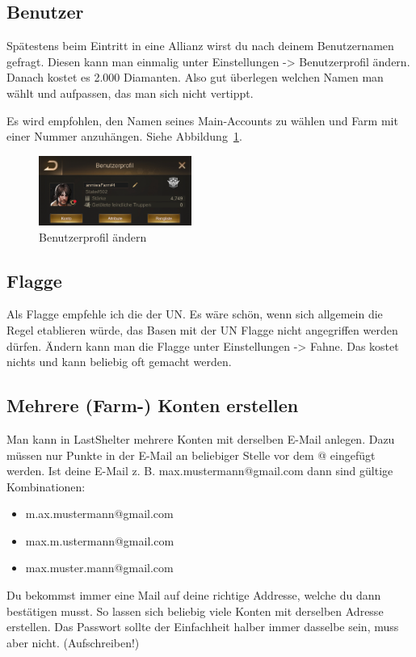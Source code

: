\documentclass[fontsize=12pt,a4paper]{scrartcl}[2003/01/01]
\begin{document}
\subsection{Benutzer}
Spätestens beim Eintritt in eine Allianz wirst du nach deinem Benutzernamen gefragt.
Diesen kann man einmalig unter Einstellungen -> Benutzerprofil ändern. Danach kostet es 2.000 Diamanten.
Also gut überlegen welchen Namen man wählt und aufpassen, das man sich nicht vertippt.

Es wird empfohlen, den Namen seines Main-Accounts zu wählen und Farm mit einer Nummer anzuhängen. Siehe Abbildung~\ref{fig:benutzer}.

\begin{figure}[H]
  \centering
     \includegraphics[width=5cm]{Bilder/IMG_E0006.JPG}
  \caption{Benutzerprofil ändern}
  \label{fig:benutzer}
\end{figure}

\subsection{Flagge}
Als Flagge empfehle ich die der UN. Es wäre schön, wenn sich allgemein die Regel etablieren würde, das Basen mit der UN Flagge nicht angegriffen werden dürfen.
Ändern kann man die Flagge unter Einstellungen -> Fahne. Das kostet nichts und kann beliebig oft gemacht werden.

\subsection{Mehrere (Farm-) Konten erstellen}
Man kann in LastShelter mehrere Konten mit derselben E-Mail anlegen. Dazu müssen nur Punkte in der E-Mail an beliebiger Stelle vor dem @ eingefügt werden.
Ist deine E-Mail z. B. max.mustermann@gmail.com dann sind gültige Kombinationen: 

\begin{itemize}
  \item m.ax.mustermann@gmail.com
  \item max.m.ustermann@gmail.com
  \item max.muster.mann@gmail.com
\end{itemize}	

Du bekommst immer eine Mail auf deine richtige Addresse, welche du dann bestätigen musst.
So lassen sich beliebig viele Konten mit derselben Adresse erstellen. Das Passwort sollte der Einfachheit halber immer dasselbe sein, muss aber nicht. (Aufschreiben!)
\end{document}
